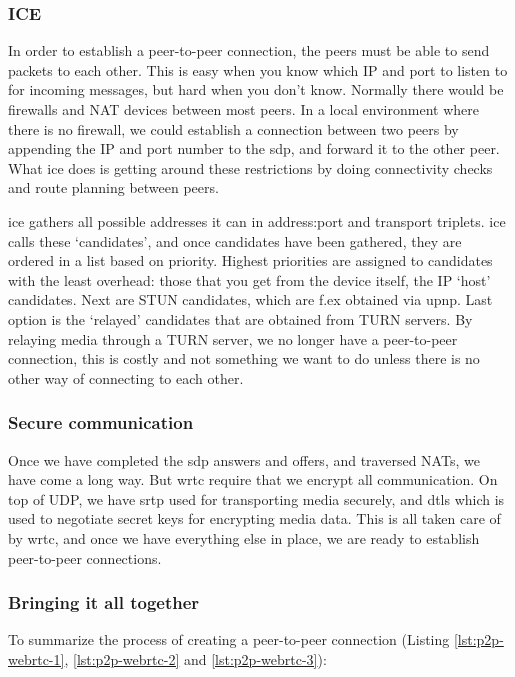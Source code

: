 \subsubsection{ICE}
In order to establish a peer-to-peer connection, the peers must be able to send packets to each other. This is easy when you know which IP and port to listen to for incoming messages, but hard when you don't know. Normally there would be firewalls and NAT devices between most peers. In a local environment where there is no firewall, we could establish a connection between two peers by appending the IP and port number to the \gls{sdp}, and forward it to the other peer. What \gls{ice} does is getting around these restrictions by doing connectivity checks and route planning between peers.

\gls{ice} gathers all possible addresses it can in address:port and transport triplets\cite{ivov_ice_2013}. \gls{ice} calls these `candidates', and once candidates have been gathered, they are ordered in a list based on priority. Highest priorities are assigned to candidates with the least overhead: those that you get from the device itself, the IP `host' candidates. Next are STUN candidates, which are f.ex obtained via \gls{upnp}. Last option is the `relayed' candidates that are obtained from TURN servers. By relaying media through a TURN server, we no longer have a peer-to-peer connection, this is costly and not something we want to do unless there is no other way of connecting to each other.

\subsubsection{Secure communication}
Once we have completed the \gls{sdp} answers and offers, and traversed NATs, we have come a long way. But \gls{wrtc} require that we encrypt all communication. On top of UDP, we have \gls{srtp} used for transporting media securely, and \gls{dtls} which is used to negotiate secret keys for encrypting media data. This is all taken care of by \gls{wrtc}, and once we have everything else in place, we are ready to establish peer-to-peer connections.

\subsubsection{Bringing it all together}
To summarize the process of creating a peer-to-peer connection (Listing \ref{lst:p2p-webrtc-1}, \ref{lst:p2p-webrtc-2} and \ref{lst:p2p-webrtc-3}):

